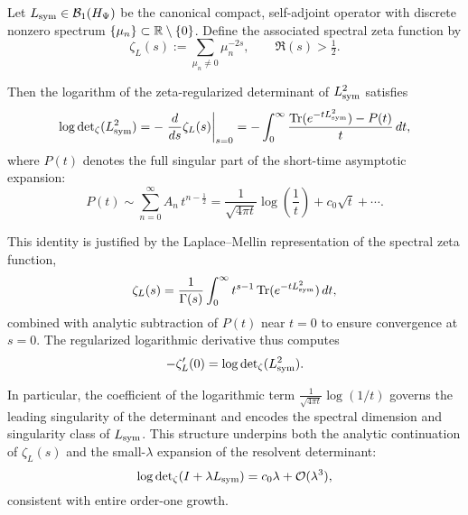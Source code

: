 \begin{lemma}
\label{lem:log_derivative_determinant}
Let \( L_{\mathrm{sym}} \in \mathcal{B}_1(H_{\Psi}) \) be the canonical compact, self-adjoint operator with discrete nonzero spectrum \( \{ \mu_n \} \subset \mathbb{R} \setminus \{0\} \). Define the associated spectral zeta function by
\[
\zeta_L(s) := \sum_{\mu_n \neq 0} \mu_n^{-2s}, \qquad \Re(s) > \tfrac{1}{2}.
\]

Then the logarithm of the zeta-regularized determinant of \( L_{\mathrm{sym}}^2 \) satisfies
\[
\log \det\nolimits_{\zeta}(L_{\mathrm{sym}}^2)
= -\left. \frac{d}{ds} \zeta_L(s) \right|_{s=0}
= -\int_0^\infty \frac{\operatorname{Tr}(e^{-t L_{\mathrm{sym}}^2}) - P(t)}{t} \, dt,
\]
where \( P(t) \) denotes the full singular part of the short-time asymptotic expansion:
\[
P(t) \sim \sum_{n=0}^\infty A_n\, t^{n - \frac{1}{2}} = \frac{1}{\sqrt{4\pi t}} \log\left( \frac{1}{t} \right) + c_0 \sqrt{t} + \cdots.
\]

\medskip
\noindent
This identity is justified by the Laplace--Mellin representation of the spectral zeta function,
\[
\zeta_L(s) = \frac{1}{\Gamma(s)} \int_0^\infty t^{s-1} \operatorname{Tr}(e^{-t L_{\mathrm{sym}}^2}) \, dt,
\]
combined with analytic subtraction of \( P(t) \) near \( t = 0 \) to ensure convergence at \( s = 0 \). The regularized logarithmic derivative thus computes
\[
-\zeta_L'(0) = \log \det\nolimits_\zeta(L_{\mathrm{sym}}^2).
\]

\medskip
\noindent
In particular, the coefficient of the logarithmic term \( \frac{1}{\sqrt{4\pi t}} \log(1/t) \) governs the leading singularity of the determinant and encodes the spectral dimension and singularity class of \( L_{\mathrm{sym}} \). This structure underpins both the analytic continuation of \( \zeta_L(s) \) and the small-\( \lambda \) expansion of the resolvent determinant:
\[
\log \det\nolimits_{\zeta}(I + \lambda L_{\mathrm{sym}}) = c_0 \lambda + \mathcal{O}(\lambda^3),
\]
consistent with entire order-one growth.
\end{lemma}
